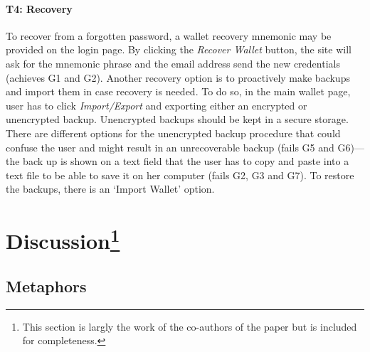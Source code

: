 \paragraph{T4: Recovery} To recover from a forgotten password, a wallet recovery mnemonic may be provided on the login page. By clicking the \emph{Recover Wallet} button, the site will ask for the mnemonic phrase and the email address send the new credentials (achieves G1 and G2). Another recovery option is to proactively make backups and import them in case recovery is needed. To do so, in the main wallet page, user has to click \emph{Import/Export} and exporting either an encrypted or unencrypted backup. Unencrypted backups should be kept in a secure storage. There are different options for the unencrypted backup procedure that could confuse the user and might result in an unrecoverable backup (fails G5 and G6)---the back up is shown on a text field that the user has to copy and paste into a text file to be able to save it on her computer (fails G2, G3 and G7). To restore the backups, there is an `Import Wallet' option.


\section[Discussion]{Discussion\footnote{This section is largly the work of the co-authors of the paper but is included for completeness.}}





\subsection{Metaphors}

